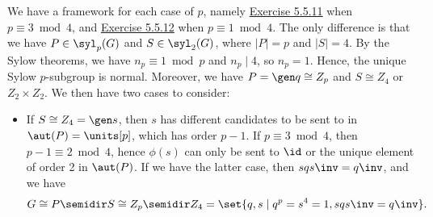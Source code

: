 \begin{sol}
    We have a framework for each case of $p$, namely \hyperref[ex5.5.11]{Exercise 5.5.11} when $p \equiv 3 \bmod 4$, and \hyperref[ex5.5.12]{Exercise 5.5.12} when $p \equiv 1 \bmod 4$. The only difference is that we have $P \in \syl_p(G)$ and $S \in \syl_2(G)$, where $|P| = p$ and $|S| = 4$. By the Sylow theorems, we have $n_p \equiv 1 \bmod p$ and $n_p \mid 4$, so $n_p = 1$. Hence, the unique Sylow $p$-subgroup is normal. Moreover, we have $P = \gen q \cong Z_p$ and $S \cong Z_4$ or $Z_2 \times Z_2$. We then have two cases to consider:
    \begin{itemize}
        \item If $S \cong Z_4 = \gen s$, then $s$ has different candidates to be sent to in $\aut(P) = \units[p]$, which has order $p - 1$. If $p \equiv 3 \bmod 4$, then $p - 1 \equiv 2 \bmod 4$, hence $\phi(s)$ can only be sent to $\id$ or the unique element of order 2 in $\aut(P)$. If we have the latter case, then $sqs\inv = q\inv$, and we have
        \[G \cong P \semidir S \cong Z_p \semidir Z_4 = \set{q, s \mid q^p = s^4 = 1, sqs\inv = q\inv}.\]
        

\end{itemize}
\end{sol}
